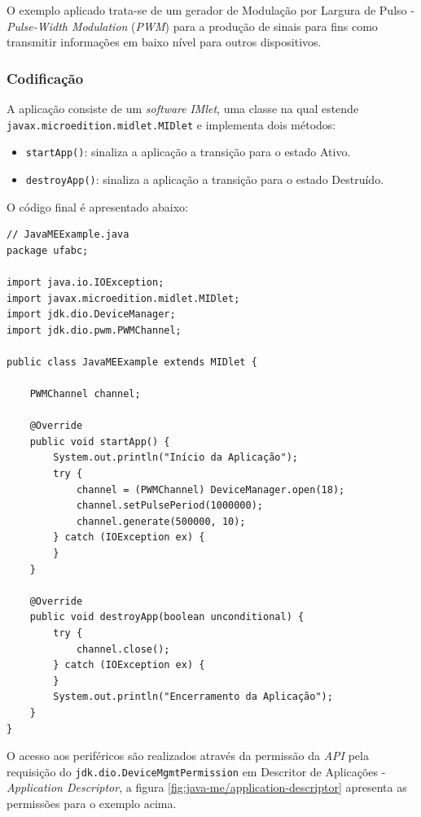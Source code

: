 O exemplo aplicado trata-se de um gerador de Modulação por Largura de Pulso - 
\textit{Pulse-Width Modulation} (\textit{PWM}) para a produção de sinais para 
fins como transmitir informações em baixo nível para outros dispositivos.

\subsubsection{Codificação}

A aplicação consiste de um \textit{software} \textit{IMlet}, uma classe na qual 
estende \newline
 \verb|javax.microedition.midlet.MIDlet| e implementa dois métodos:

\begin{itemize}
    
    \item \verb|startApp()|: sinaliza a aplicação a transição para o estado 
    Ativo.
    
    \item \verb|destroyApp()|: sinaliza a aplicação a transição para o estado 
    Destruído.
    
\end{itemize}

O código final é apresentado abaixo:
\newpage
\begin{verbatim}
// JavaMEExample.java
package ufabc;

import java.io.IOException;
import javax.microedition.midlet.MIDlet;
import jdk.dio.DeviceManager;
import jdk.dio.pwm.PWMChannel;

public class JavaMEExample extends MIDlet {
    
    PWMChannel channel;
    
    @Override
    public void startApp() {
        System.out.println("Início da Aplicação");
        try {
            channel = (PWMChannel) DeviceManager.open(18);
            channel.setPulsePeriod(1000000);
            channel.generate(500000, 10);
        } catch (IOException ex) {
        }
    }

    @Override
    public void destroyApp(boolean unconditional) {
        try {
            channel.close();
        } catch (IOException ex) {
        }
        System.out.println("Encerramento da Aplicação");
    }
}
\end{verbatim}

O acesso aos periféricos são realizados através da permissão da \textit{API} pela requisição do \verb|jdk.dio.DeviceMgmtPermission| em 
Descritor de Aplicações - \textit{Application Descriptor}, a figura 
\ref{fig:java-me/application-descriptor} apresenta as permissões para o exemplo 
acima.

